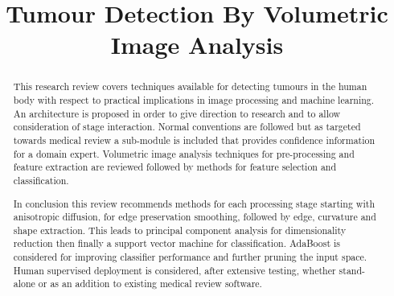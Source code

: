 \documentclass[journal]{IEEEtran}
\begin{document}
\title{Tumour Detection By Volumetric Image Analysis}
\author{
}


{}

\maketitle





\begin{abstract}

This research review covers techniques available for detecting tumours in the human body with respect to practical implications in image processing and machine learning.   
An architecture is proposed in order to give direction to research and to allow consideration of stage interaction.
Normal conventions are followed but as targeted towards medical review a sub-module is included that provides confidence information for a domain expert.  
Volumetric image analysis techniques for pre-processing and feature extraction are reviewed followed by methods for feature selection and classification. 
 

In conclusion this review recommends methods for each processing stage starting with anisotropic diffusion, for edge preservation smoothing, followed by edge, curvature and shape extraction.
This leads to principal component analysis for dimensionality reduction then finally a support vector machine for classification.
AdaBoost is considered for improving classifier performance and further pruning the input space.
Human supervised deployment is considered, after extensive testing, whether stand-alone or as an addition to existing medical review software.

\end{abstract}










\IEEEpeerreviewmaketitle
\end{document}

